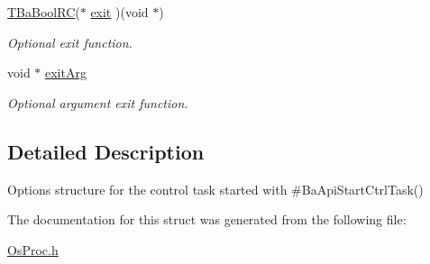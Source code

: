 \begin{DoxyCompactItemize}
\hyperlink{BaBool_8h_a84d5a0de4729ca4c89f2479c605dbf3d}{T\+Ba\+Bool\+RC}($\ast$ \hyperlink{structTOsProcCtrlTaskOpts_a5ab98d06a1e8e23dbce548e8303aa6ac}{exit} )(void $\ast$)
\begin{DoxyCompactList}\small\item\em Optional exit function. \end{DoxyCompactList}\item 
\mbox{\label{structTOsProcCtrlTaskOpts_a19c3110bcab4a63f42ac4b080f2786bb}} 
void $\ast$ \hyperlink{structTOsProcCtrlTaskOpts_a19c3110bcab4a63f42ac4b080f2786bb}{exit\+Arg}
\begin{DoxyCompactList}\small\item\em Optional argument exit function. \end{DoxyCompactList}\end{DoxyCompactItemize}


\subsection{Detailed Description}
Options structure for the control task started with \#\+Ba\+Api\+Start\+Ctrl\+Task() 

The documentation for this struct was generated from the following file\+:\begin{DoxyCompactItemize}
\item 
\hyperlink{OsProc_8h}{Os\+Proc.\+h}\end{DoxyCompactItemize}
